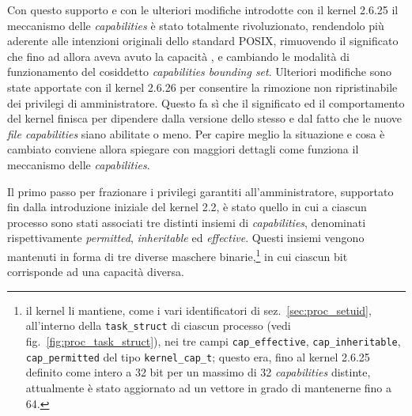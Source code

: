 Con questo supporto e con le ulteriori modifiche introdotte con il kernel
2.6.25 il meccanismo delle \textit{capabilities} è stato totalmente
rivoluzionato, rendendolo più aderente alle intenzioni originali dello
standard POSIX, rimuovendo il significato che fino ad allora aveva avuto la
capacità , e cambiando le modalità di funzionamento del
cosiddetto \textit{capabilities bounding set}. Ulteriori modifiche sono state
apportate con il kernel 2.6.26 per consentire la rimozione non ripristinabile
dei privilegi di amministratore. Questo fa sì che il significato ed il
comportamento del kernel finisca per dipendere dalla versione dello stesso e
dal fatto che le nuove \textit{file capabilities} siano abilitate o meno. Per
capire meglio la situazione e cosa è cambiato conviene allora spiegare con
maggiori dettagli come funziona il meccanismo delle \textit{capabilities}.

Il primo passo per frazionare i privilegi garantiti all'amministratore,
supportato fin dalla introduzione iniziale del kernel 2.2, è stato quello in
cui a ciascun processo sono stati associati tre distinti insiemi di
\textit{capabilities}, denominati rispettivamente \textit{permitted},
\textit{inheritable} ed \textit{effective}. Questi insiemi vengono mantenuti
in forma di tre diverse maschere binarie,\footnote{il kernel li mantiene, come
  i vari identificatori di sez.~\ref{sec:proc_setuid}, all'interno della
  \texttt{task\_struct} di ciascun processo (vedi
  fig.~\ref{fig:proc_task_struct}), nei tre campi \texttt{cap\_effective},
  \texttt{cap\_inheritable}, \texttt{cap\_permitted} del tipo
  \texttt{kernel\_cap\_t}; questo era, fino al kernel 2.6.25 definito come
  intero a 32 bit per un massimo di 32 \textit{capabilities} distinte,
  attualmente è stato aggiornato ad un vettore in grado di mantenerne fino a
  64.} in cui ciascun bit corrisponde ad una capacità diversa.

